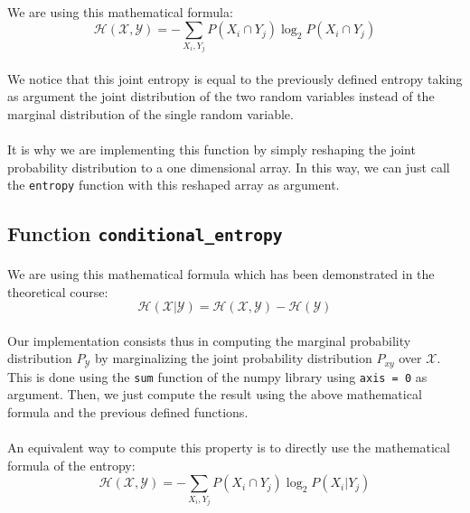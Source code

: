 \documentclass[a4paper, 11pt, oneside]{article}
\begin{document}
\paragraph{}We are using this mathematical formula: 
$$ \mathcal{H}(\mathcal{X}, \mathcal{Y}) = - \sum_{X_i, Y_j} P(X_i \cap Y_j) \log_2{P(X_i \cap Y_j)} $$

\paragraph{}We notice that this joint entropy is equal to the previously defined entropy taking as argument the joint distribution of the two random variables instead of the marginal distribution of the single random variable.

\paragraph{}It is why we are implementing this function by simply reshaping the joint probability distribution to a one dimensional array. In this way, we can just call the \texttt{entropy} function with this reshaped array as argument.

\subsection{Function \texttt{conditional\_entropy}}

\paragraph{}We are using this mathematical formula which has been demonstrated in the theoretical course:
$$ \mathcal{H}(\mathcal{X} | \mathcal{Y}) = \mathcal{H}(\mathcal{X} , \mathcal{Y}) - \mathcal{H}(\mathcal{Y}) $$

\paragraph{}Our implementation consists thus in computing the marginal probability distribution $P_\mathcal{Y}$ by marginalizing the joint probability distribution $P_{xy}$ over $\mathcal{X}$. This is done using the \texttt{sum} function of the numpy library using \texttt{axis = 0} as argument. Then, we just compute the result using the above mathematical formula and the previous defined functions.

\paragraph{}An equivalent way to compute this property is to directly use the mathematical formula of the entropy:
$$ \mathcal{H}(\mathcal{X}, \mathcal{Y}) = - \sum_{X_i, Y_j} P(X_i \cap Y_j) \log_2{P(X_i | Y_j)} $$
\end{document}
